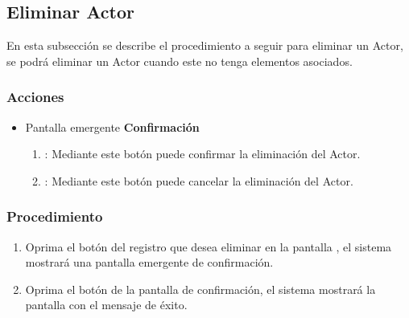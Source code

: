 \subsection{Eliminar Actor}

En esta subsección se describe el procedimiento a seguir para eliminar un Actor, se podrá eliminar un Actor cuando este no tenga elementos asociados.

\subsubsection{Acciones}
\begin{itemize}
  \item Pantalla emergente \textbf{Confirmación}
  \begin{enumerate}
	\item {}: Mediante este botón puede confirmar la eliminación del Actor.
	\item {}: Mediante este botón puede cancelar la eliminación del Actor.
  \end{enumerate}
\end{itemize}

\subsubsection{Procedimiento}
\begin{enumerate}
	\item Oprima el botón \btnEliminar del registro que desea eliminar en la pantalla , el sistema mostrará una pantalla emergente de confirmación.
	
	\item Oprima el botón  de la pantalla de confirmación, el sistema mostrará la pantalla  con el mensaje de éxito.
\end{enumerate}

